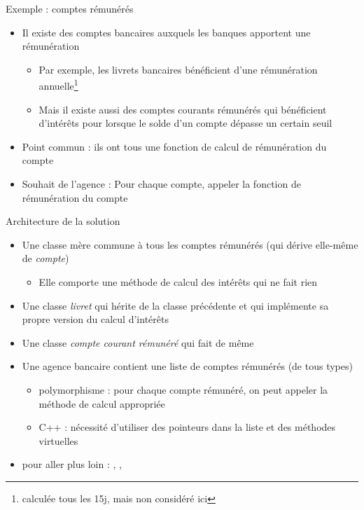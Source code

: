 \begin{frame}{Exemple : comptes rémunérés}
\begin{itemize}
\item Il existe des comptes bancaires auxquels les banques apportent une rémunération
\begin{itemize}
\item Par exemple, les livrets bancaires bénéficient d'une rémunération annuelle\footnote{calculée tous les 15j, mais non considéré ici}
\item Mais il existe aussi des comptes courants rémunérés qui bénéficient d'intérêts pour lorsque le solde d'un compte dépasse un certain seuil
\end{itemize}
\item Point commun : ils ont tous une fonction de calcul de rémunération du compte
\item Souhait de l'agence : Pour chaque compte, appeler la fonction de rémunération du compte
\end{itemize}
\end{frame}

\begin{frame}{Architecture de la solution}
\begin{itemize}
\item Une classe mère commune à tous les comptes rémunérés (qui dérive elle-même de \textit{compte})
\begin{itemize}
\item Elle comporte une méthode de calcul des intérêts qui ne fait rien
\end{itemize}
\item Une classe \textit{livret} qui hérite de la classe précédente et qui implémente sa propre version du calcul d'intérêts
\item Une classe \textit{compte courant rémunéré} qui fait de même
\item Une agence bancaire contient une liste de comptes rémunérés (de tous types)
\begin{itemize}
\item polymorphisme : pour chaque compte rémunéré, on peut appeler la méthode de calcul appropriée
\item C++ : nécessité d'utiliser des pointeurs dans la liste et des méthodes virtuelles
\end{itemize}
\item pour aller plus loin : \hyperlink{secabstract}{}, \hyperlink{sectypeid}{}, \hyperlink{secstl}{}
\end{itemize}
\end{frame}

